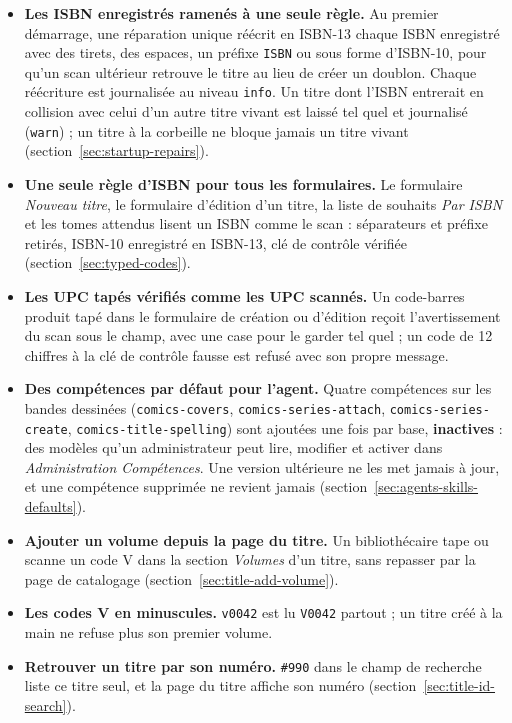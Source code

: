 \begin{itemize}
  \item \textbf{Les ISBN enregistrés ramenés à une seule règle.} Au
        premier démarrage, une réparation unique réécrit en ISBN-13
        chaque ISBN enregistré avec des tirets, des espaces, un préfixe
        \texttt{ISBN} ou sous forme d'ISBN-10, pour qu'un scan ultérieur
        retrouve le titre au lieu de créer un doublon. Chaque réécriture
        est journalisée au niveau \texttt{info}. Un titre dont l'ISBN
        entrerait en collision avec celui d'un autre titre vivant est
        laissé tel quel et journalisé (\texttt{warn}) ; un titre à la
        corbeille ne bloque jamais un titre vivant
        (section~\ref{sec:startup-repairs}).
  \item \textbf{Une seule règle d'ISBN pour tous les formulaires.} Le
        formulaire \emph{Nouveau titre}, le formulaire d'édition d'un
        titre, la liste de souhaits \emph{Par ISBN} et les tomes attendus
        lisent un ISBN comme le scan : séparateurs et préfixe retirés,
        ISBN-10 enregistré en ISBN-13, clé de contrôle vérifiée
        (section~\ref{sec:typed-codes}).
  \item \textbf{Les UPC tapés vérifiés comme les UPC scannés.} Un
        code-barres produit tapé dans le formulaire de création ou
        d'édition reçoit l'avertissement du scan sous le champ, avec une
        case pour le garder tel quel ; un code de 12 chiffres à la clé
        de contrôle fausse est refusé avec son propre message.
  \item \textbf{Des compétences par défaut pour l'agent.} Quatre
        compétences sur les bandes dessinées (\texttt{comics-covers},
        \texttt{comics-series-attach}, \texttt{comics-series-create},
        \texttt{comics-title-spelling}) sont ajoutées une fois par base,
        \textbf{inactives} : des modèles qu'un administrateur peut lire,
        modifier et activer dans \emph{Administration \textrightarrow{}
        Compétences}. Une version ultérieure ne les met jamais à jour,
        et une compétence supprimée ne revient jamais
        (section~\ref{sec:agents-skills-defaults}).
  \item \textbf{Ajouter un volume depuis la page du titre.} Un
        bibliothécaire tape ou scanne un code V dans la section
        \emph{Volumes} d'un titre, sans repasser par la page de
        catalogage (section~\ref{sec:title-add-volume}).
  \item \textbf{Les codes V en minuscules.} \texttt{v0042} est lu
        \texttt{V0042} partout ; un titre créé à la main ne refuse plus
        son premier volume.
  \item \textbf{Retrouver un titre par son numéro.} \texttt{\#990} dans
        le champ de recherche liste ce titre seul, et la page du titre
        affiche son numéro (section~\ref{sec:title-id-search}).
\end{itemize}

